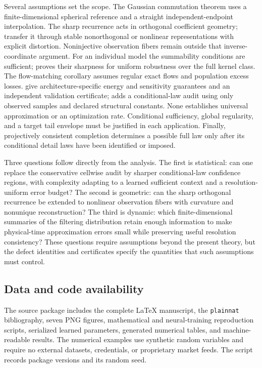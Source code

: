 Several assumptions set the scope. The Gaussian commutation theorem uses a finite-dimensional spherical reference and a straight independent-endpoint interpolation. The sharp recurrence acts in orthogonal coefficient geometry;  transfer it through stable nonorthogonal or nonlinear representations with explicit distortion. Noninjective observation fibers remain outside that inverse-coordinate argument. For an individual model the summability conditions are sufficient;  proves their sharpness for uniform robustness over the full kernel class. The flow-matching corollary assumes regular exact flows and population excess losses.  give architecture-specific energy and sensitivity guarantees and an independent validation certificate;  adds a conditional-law audit using only observed samples and declared structural constants. None establishes universal approximation or an optimization rate. Conditional sufficiency, global regularity, and a target tail envelope must be justified in each application. Finally, projectively consistent completion determines a possible full law only after its conditional detail laws have been identified or imposed.

Three questions follow directly from the analysis. The first is statistical: can one replace the conservative cellwise audit by sharper conditional-law confidence regions, with complexity adapting to a learned sufficient context and a resolution-uniform error budget? The second is geometric: can the sharp orthogonal recurrence be extended to nonlinear observation fibers with curvature and nonunique reconstruction? The third is dynamic: which finite-dimensional summaries of the filtering distribution retain enough information to make physical-time approximation errors small while preserving useful resolution consistency? These questions require assumptions beyond the present theory, but the defect identities and certificates specify the quantities that such assumptions must control.

\subsection*{Data and code availability}
The source package includes the complete \LaTeX{} manuscript, the \texttt{plainnat} bibliography, seven PNG figures, mathematical and neural-training reproduction scripts, serialized learned parameters, generated numerical tables, and machine-readable results. The numerical examples use synthetic random variables and require no external datasets, credentials, or proprietary market feeds. The script records package versions and its random seed.
